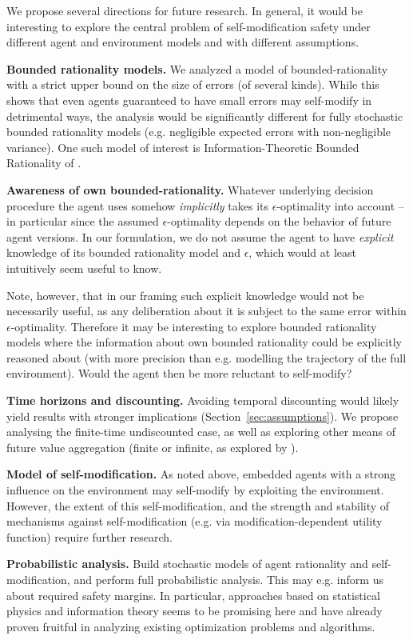 We propose several directions for future research. In general, it would be interesting to explore the central problem of self-modification safety under different agent and environment models and with different assumptions.

\smallskip
\noindent
\textbf{Bounded rationality models.} We analyzed a model of bounded-rationality with a strict upper bound on the size of errors (of several kinds). While this shows that even agents guaranteed to have small errors may self-modify in detrimental ways, the analysis would be significantly different for fully stochastic bounded rationality models (e.g. negligible expected errors with non-negligible variance). One such model of interest is Information-Theoretic Bounded Rationality of \citet{ortega2015informationtheoretic}.

\smallskip
\noindent
\textbf{Awareness of own bounded-rationality.} Whatever underlying decision procedure the agent uses somehow \emph{implicitly} takes its $\epsilon$-optimality into account -- in particular since the assumed $\epsilon$-optimality depends on the behavior of future agent versions. In our formulation, we do not assume the agent to have \emph{explicit} knowledge of its bounded rationality model and $\epsilon$, which would at least intuitively seem useful to know. 

Note, however, that in our framing such explicit knowledge would not be necessarily useful, as any deliberation about it is subject to the same error within $\epsilon$-optimality. Therefore it may be interesting to explore bounded rationality models where the information about own bounded rationality could be explicitly reasoned about (with more precision than e.g. modelling the trajectory of the full environment). Would the agent then be more reluctant to self-modify?

\smallskip
\noindent
\textbf{Time horizons and discounting.} Avoiding temporal discounting would likely yield results with stronger implications (Section~\ref{sec:assumptions}). We propose analysing the finite-time undiscounted case, as well as exploring other means of future value aggregation (finite or infinite, as explored by \citet{Bostrom2011}). 

\smallskip
\noindent
\textbf{Model of self-modification.} As noted above, embedded agents with a strong influence on the environment may self-modify by exploiting the environment. However, the extent of this self-modification, and the strength and stability of mechanisms against self-modification (e.g. via modification-dependent utility function) require further research.

\smallskip
\noindent
\textbf{Probabilistic analysis.} Build stochastic models of agent rationality and self-modification, and perform full probabilistic analysis. This may e.g. inform us about required safety margins. In particular, approaches based on statistical physics and information theory seems to be promising here and have already proven fruitful in analyzing existing optimization problems and algorithms.
